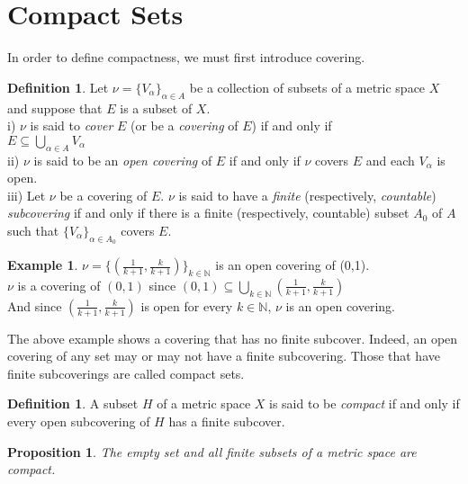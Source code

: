 \documentclass[12pt, reqno]{amsart}
\newtheorem{proposition}[theorem]{Proposition}
\theoremstyle{definition}
\newtheorem{definition}[theorem]{Definition}
\newtheorem{example}[theorem]{Example}
\numberwithin{equation}{section}
\newcommand{\dN}{{\mathbb N}}
\begin{document}
\section{Compact Sets}
In order to define compactness, we must first introduce covering.
\begin{definition}\cite{s1}
    Let $\nu = \{V_\alpha\}_{\alpha \in A}$ be a collection of subsets of a metric space $X$ and suppose that $E$ is a subset of $X$.\\
    i) $\nu$ is said to \textit{cover} $E$ (or be a \textit{covering} of $E$) if and only if\\
    \hspace*{5cm} $E \subseteq \bigcup_{\alpha \in A} V_\alpha$\\
    ii) $\nu$ is said to be an \textit{open covering} of $E$ if and only if $\nu$ covers $E$ and each $V_\alpha$ is open.\\
    iii) Let $\nu$ be a covering of $E$. $\nu$ is said to have a \textit{finite} (respectively, \textit{countable}) \textit{subcovering} if and only if there is a finite (respectively, countable) subset $A_0$ of $A$ such that $\{V_\alpha\}_{\alpha \in A_0}$ covers $E$.
\end{definition}
\begin{example}
     $\nu = \{(\frac{1}{k+1},\frac{k}{k+1})\}_{k \in \dN}$ is an open covering of (0,1).\\
     $\nu$ is a covering of $(0,1)$ since $(0,1) \subseteq \bigcup_{k \in \dN} (\frac{1}{k+1},\frac{k}{k+1})$\\
     And since $(\frac{1}{k+1},\frac{k}{k+1})$ is open for every $k \in \dN$, $\nu$ is an open covering.
\end{example}
The above example shows a covering that has no finite subcover. Indeed, an open covering of any set may or may not have a finite subcovering. Those that have finite subcoverings are called compact sets.
\begin{definition} \label{compact}\cite{s1}
    A subset $H$ of a metric space $X$ is said to be \textit{compact} if and only if every open subcovering of $H$ has a finite subcover.
\end{definition}

\begin{proposition}\cite{s1}
\textit{The empty set and all finite subsets of a metric space are compact.}
\end{proposition}
\end{document}
